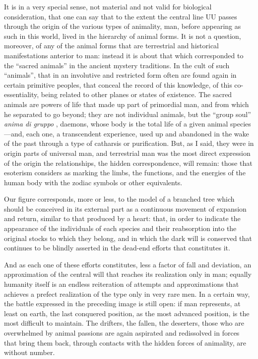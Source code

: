 It is in a very special sense, not material and not valid for biological consideration, that one can say that to the extent the central line UU passes through the origin of the various types of animality, man, before appearing as such in this world, lived in the hierarchy of animal forms. It is not a question, moreover, of any of the animal forms that are terrestrial and historical manifestations anterior to man: instead it is about that which corresponded to the ``sacred animals'' in the ancient mystery traditions. In the cult of such ``animals'', that in an involutive and restricted form often are found again in certain primitive peoples, that conceal the record of this knowledge, of this co-essentiality, being related to other planes or states of existence. The sacred animals are powers of life that made up part of primordial man, and from which he separated to go beyond; they are not individual animals, but the ``group soul'' \emph{anima di gruppo} , daemons, whose body is the total life of a given animal species---and, each one, a transcendent experience, used up and abandoned in the wake of the past through a type of catharsis or purification. But, as I said, they were in origin parts of universal man, and terrestrial man was the most direct expression of the origin the relationships, the hidden correspondence, will remain: those that esoterism considers as marking the limbs, the functions, and the energies of the human body with the zodiac symbols or other equivalents.

Our figure corresponds, more or less, to the model of a branched tree which should be conceived in its external part as a continuous movement of expansion and return, similar to that produced by a heart: that, in order to indicate the appearance of the individuals of each species and their reabsorption into the original stocks to which they belong, and in which the dark will is conserved that continues to be blindly asserted in the dead-end efforts that constitutes it.

And as each one of these efforts constitutes, less a factor of fall and deviation, an approximation of the central will that reaches its realization only in man; equally humanity itself is an endless reiteration of attempts and approximations that achieves a prefect realization of the type only in very rare men. In a certain way, the battle expressed in the preceding image is still open: if man represents, at least on earth, the last conquered position, as the most advanced position, is the most difficult to maintain. The drifters, the fallen, the deserters, those who are overwhelmed by animal passions are again aspirated and redissolved in forces that bring them back, through contacts with the hidden forces of animality, are without number.

